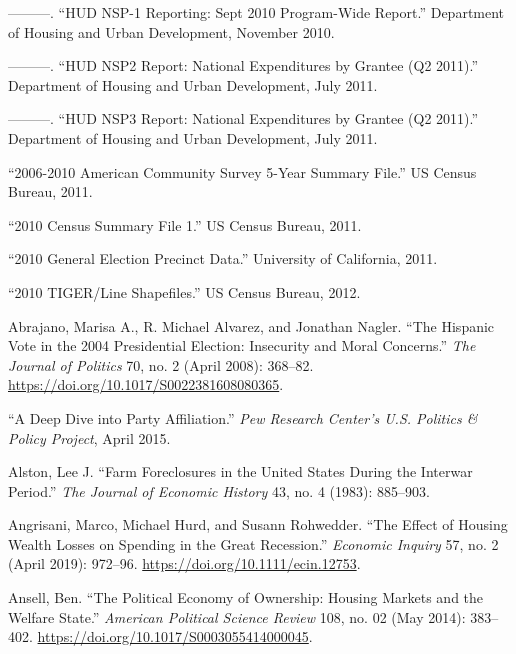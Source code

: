 \documentclass[12pt,oneside]{psthesis}
\begin{document}
\leavevmode\hypertarget{ref-185682010hud}{}%
---------. ``HUD NSP-1 Reporting: Sept 2010 Program-Wide Report.'' Department of Housing and Urban Development, November 2010.

\leavevmode\hypertarget{ref-185682011huda}{}%
---------. ``HUD NSP2 Report: National Expenditures by Grantee (Q2 2011).'' Department of Housing and Urban Development, July 2011.

\leavevmode\hypertarget{ref-185682011hud}{}%
---------. ``HUD NSP3 Report: National Expenditures by Grantee (Q2 2011).'' Department of Housing and Urban Development, July 2011.

\leavevmode\hypertarget{ref-201120062010}{}%
``2006-2010 American Community Survey 5-Year Summary File.'' US Census Bureau, 2011.

\leavevmode\hypertarget{ref-20112010b}{}%
``2010 Census Summary File 1.'' US Census Bureau, 2011.

\leavevmode\hypertarget{ref-20112010}{}%
``2010 General Election Precinct Data.'' University of California, 2011.

\leavevmode\hypertarget{ref-20122010}{}%
``2010 TIGER/Line Shapefiles.'' US Census Bureau, 2012.

\leavevmode\hypertarget{ref-abrajano2008hispanic}{}%
Abrajano, Marisa A., R. Michael Alvarez, and Jonathan Nagler. ``The Hispanic Vote in the 2004 Presidential Election: Insecurity and Moral Concerns.'' \emph{The Journal of Politics} 70, no. 2 (April 2008): 368--82. \url{https://doi.org/10.1017/S0022381608080365}.

\leavevmode\hypertarget{ref-2015deep}{}%
``A Deep Dive into Party Affiliation.'' \emph{Pew Research Center's U.S. Politics \& Policy Project}, April 2015.

\leavevmode\hypertarget{ref-alston1983farm}{}%
Alston, Lee J. ``Farm Foreclosures in the United States During the Interwar Period.'' \emph{The Journal of Economic History} 43, no. 4 (1983): 885--903.

\leavevmode\hypertarget{ref-angrisani2019effect}{}%
Angrisani, Marco, Michael Hurd, and Susann Rohwedder. ``The Effect of Housing Wealth Losses on Spending in the Great Recession.'' \emph{Economic Inquiry} 57, no. 2 (April 2019): 972--96. \url{https://doi.org/10.1111/ecin.12753}.

\leavevmode\hypertarget{ref-ansellPoliticalEconomyOwnership2014}{}%
Ansell, Ben. ``The Political Economy of Ownership: Housing Markets and the Welfare State.'' \emph{American Political Science Review} 108, no. 02 (May 2014): 383--402. \url{https://doi.org/10.1017/S0003055414000045}.
\end{document}
